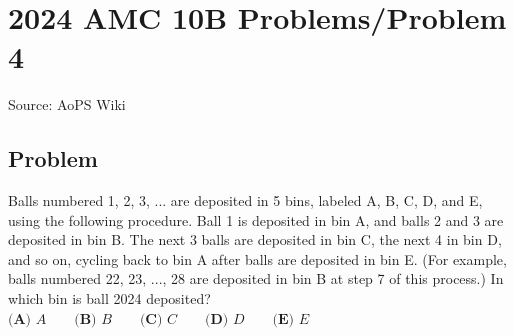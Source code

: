\documentclass[12pt]{article}
\begin{document}
\section*{{2024 AMC 10B Problems/Problem 4}}
Source: AoPS Wiki

\subsection*{Problem}
Balls numbered 1, 2, 3, ... are deposited in 5 bins, labeled A, B, C, D, and E, using the following procedure. Ball 1 is deposited in bin A, and balls 2 and 3 are deposited in bin B. The next 3 balls are deposited in bin C, the next 4 in bin D, and so on, cycling back to bin A after balls are deposited in bin E. (For example, balls numbered 22, 23, ..., 28 are deposited in bin B at step 7 of this process.) In which bin is ball 2024 deposited? $\textbf{(A) } A \qquad\textbf{(B) } B \qquad\textbf{(C) } C \qquad\textbf{(D) } D \qquad\textbf{(E) } E$
\end{document}

